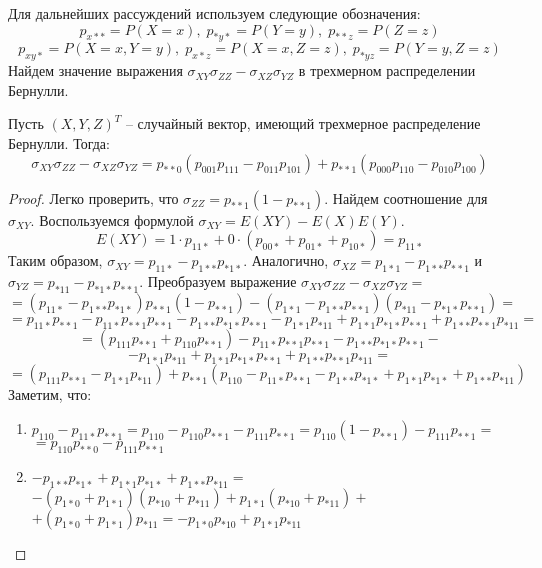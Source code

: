 Для дальнейших рассуждений используем следующие обозначения: 
$$p_{x**}=P(X=x), \; p_{*y*}=P(Y=y), \; p_{**z}=P(Z=z)$$ 
$$  p_{xy*}=P(X=x, Y=y),\; p_{x*z}=P(X=x, Z=z), \; p_{*yz}=P(Y=y, Z=z)$$
Найдем значение выражения $\sigma_{XY} \sigma_{ZZ} - \sigma_{XZ} \sigma_{YZ}$ в трехмерном распределении Бернулли.
\begin{lemma}\label{partial_cov}
    Пусть $(X,Y,Z)^T$ -- случайный вектор, имеющий трехмерное распределение Бернулли. Тогда:
    $$\sigma_{XY} \sigma_{ZZ} - \sigma_{XZ} \sigma_{YZ} = p_{**0}(p_{001}p_{111}-p_{011}p_{101}) + p_{**1} (p_{000}p_{110}-p_{010}p_{100})$$
\end{lemma}
\begin{proof}
    Легко проверить, что $\sigma_{ZZ}= p_{**1}(1-p_{**1})$. Найдем соотношение для $\sigma_{XY}$. Воспользуемся формулой $\sigma_{XY}=E(X Y)-E(X)E(Y)$.
    $$E(X Y) = 1 \cdot p_{11*} + 0 \cdot (p_{00*} + p_{01*} + p_{10*})=p_{11*}$$
    Таким образом, $\sigma_{XY}=p_{11*}-p_{1**}p_{*1*}$. Аналогично, $\sigma_{XZ}=p_{1*1}-p_{1**}p_{**1}$ и $\sigma_{YZ}=p_{*11}-p_{*1*}p_{**1}$.
    Преобразуем выражение $\sigma_{XY} \sigma_{ZZ} - \sigma_{XZ} \sigma_{YZ} =$
    $$
        = (p_{11*}-p_{1**}p_{*1*}) p_{**1}(1-p_{**1})
        -(p_{1*1}-p_{1**}p_{**1})(p_{*11}-p_{*1*}p_{**1})=
    $$
    $$
        = p_{11*}p_{**1} - p_{11*}p_{**1}p_{**1} - p_{1**}p_{*1*}p_{**1} 
        -p_{1*1}p_{*11}+p_{1*1}p_{*1*}p_{**1}+p_{1**}p_{**1}p_{*11} =
    $$
    $$
        =(p_{111}p_{**1}+p_{110}p_{**1}) - p_{11*}p_{**1}p_{**1} - p_{1**}p_{*1*}p_{**1} -
    $$ $$
        -p_{1*1}p_{*11}+p_{1*1}p_{*1*}p_{**1}+p_{1**}p_{**1}p_{*11}=
    $$
    \begin{equation}\label{some_step}
        =(p_{111}p_{**1}-p_{1*1}p_{*11})+p_{**1}(p_{110}-p_{11*}p_{**1} - p_{1**}p_{*1*} + p_{1*1}p_{*1*} + p_{1**}p_{*11})
    \end{equation}
    Заметим, что:
    \begin{enumerate}
    \item 
    $
        p_{110}-p_{11*}p_{**1}=p_{110}-p_{110}p_{**1}-p_{111}p_{**1}=
        p_{110}(1-p_{**1})-p_{111}p_{**1}=
    $\\
    $ 
        =p_{110}p_{**0}-p_{111}p_{**1}
    $
    \item
    $
        -p_{1**}p_{*1*} + p_{1*1}p_{*1*} + p_{1**}p_{*11}=
    $
    $
        -(p_{1*0}+p_{1*1})(p_{*10}+p_{*11})+p_{1*1}(p_{*10}+p_{*11}) + $ \\
    $+(p_{1*0}+p_{1*1})p_{*11}=
        -p_{1*0}p_{*10}+p_{1*1}p_{*11}
    $
    \end{enumerate}

\end{proof}
